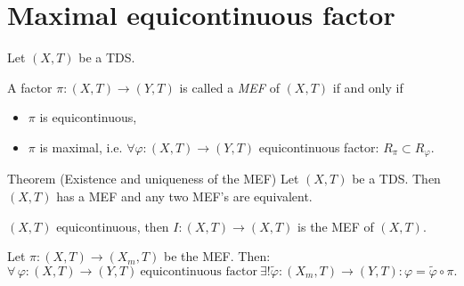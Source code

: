 \section{Maximal equicontinuous factor}
\begin{frame}
  Let $(X,T)$ be a TDS.
  \begin{definition}
    A factor $\pi : (X,T) \to (Y,T)$ is called a \emph{MEF} of $(X,T)$ if and only if
  \begin{itemize}
    \item $\pi$ is equicontinuous,
    \item $\pi$ is maximal, i.e. $\forall \varphi : (X,T) \to (Y,T)$ equicontinuous factor: $R_\pi \subset R_\varphi$.
  \end{itemize}
\end{definition}
\pause
  \begin{alertblock}{Theorem (Existence and uniqueness of the MEF)}
  Let $(X,T)$ be a TDS.
  Then $(X,T)$ has a MEF and any two MEF's are equivalent.
  \end{alertblock}
  \pause
\begin{example}
  $(X,T)$ equicontinuous, then $I: (X,T) \to (X,T)$ is the MEF of $(X,T)$.
\end{example}

\end{frame}
\begin{frame}[fragile]
\begin{proposition}
  Let $\pi : (X, T) \to  (X_m,T)$ be the MEF.
  Then:
  \begin{equation*}
    \forall \, \varphi : (X,T) \to (Y,T) \ \text{equicontinuous factor} \ \exists!\tilde{\varphi}: (X_m,T) \to (Y,T): \varphi = \tilde{\varphi} \circ \pi.
  \end{equation*}
  \end{proposition}
  \begin{center}
  \end{center}
\end{frame}
